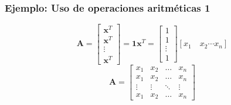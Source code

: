 \documentclass{beamer}
\begin{document}
\begin{frame}
\frametitle{Ejemplo: Uso de operaciones aritméticas 1}
\begin{equation*}
\boldsymbol{A}= \begin{bmatrix} \boldsymbol{x}^T  \\ \boldsymbol{x}^T  \\ \vdots \\ \boldsymbol{x}^T   \end{bmatrix}= \boldsymbol{1} \boldsymbol{x}^T = \begin{bmatrix} 1  \\ 1 \\ \vdots \\ 1  \end{bmatrix} [x_{1} \hspace{1em} x_{2} \cdots x_{n}]
\end{equation*}
\begin{equation*}
\boldsymbol{A} = \begin{bmatrix} x_{1}  &  x_{2} & \dots & x_{n}\\ x_{1} &  x_{2} & \dots & x_{n} \\ \vdots &  \vdots & \ddots & \vdots \\ x_{1} &  x_{2} & \dots & x_{n} \end{bmatrix}
\end{equation*}
\end{frame}
\end{document}
